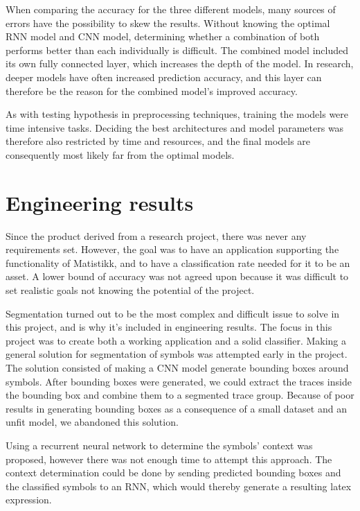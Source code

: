 When comparing the accuracy for the three different models, many sources of errors have the possibility to skew the results. Without knowing the optimal RNN model and CNN model, determining whether a combination of both performs better than each individually is difficult. The combined model included its own fully connected layer, which increases the depth of the model. In research, deeper models have often increased prediction accuracy, and this layer can therefore be the reason for the combined model's improved accuracy.

As with testing hypothesis in preprocessing techniques, training the models were time intensive tasks. Deciding the best architectures and model parameters was therefore also restricted by time and resources, and the final models are consequently most likely far from the optimal models.


\section{Engineering results}
\label{engineering_results}


Since the product derived from a research project, there was never any requirements set. However, the goal was to have an application supporting the functionality of Matistikk, and to have a classification rate needed for it to be an asset. A lower bound of accuracy was not agreed upon because it was difficult to set realistic goals not knowing the potential of the project. 

Segmentation turned out to be the most complex and difficult issue to solve in this project, and is why it's included in engineering results. The focus in this project was to create both a working application and a solid classifier. Making a general solution for segmentation of symbols was attempted early in the project. The solution consisted of making a CNN model generate bounding boxes around symbols. After bounding boxes were generated, we could extract the traces inside the bounding box and combine them to a segmented trace group. Because of poor results in generating bounding boxes as a consequence of a small dataset and an unfit model, we abandoned this solution.

Using a recurrent neural network to determine the symbols' context was proposed, however there was not enough time to attempt this approach. The context determination could be done by sending predicted bounding boxes and the classified symbols to an RNN, which would thereby generate a resulting latex expression. 

